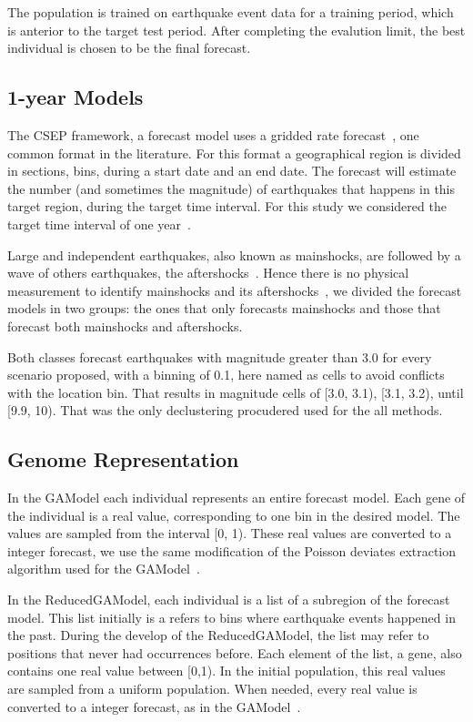The population is trained on earthquake event data for a training
period, which is anterior to the target test period. After completing
the evalution limit, the best individual is chosen to be the final
forecast.

\subsection{1-year Models}
The CSEP framework, a forecast model uses a gridded rate
forecast~\cite{zechar2010evaluating}, one common format in the
literature. For this format a geographical region is divided in
sections, bins, during a start date and an end date. The forecast will
estimate the number (and sometimes the magnitude) of earthquakes that
happens in this target region, during the target time interval. For
this study we considered the target time interval of one
year~\cite{ecta14}.

Large and independent earthquakes, also known as mainshocks, are
followed by a wave of others earthquakes, the
aftershocks~\cite{schorlemmer2010first}. Hence there is no physical
measurement to identify mainshocks and its
aftershocks~\cite{schorlemmer2010first}, we divided the forecast
models in two groups: the ones that only forecasts mainshocks and
those that forecast both mainshocks and aftershocks.

Both classes forecast earthquakes with magnitude greater than 3.0 for
every scenario proposed, with a binning of 0.1, here named as cells to
avoid conflicts with the location bin. That results in magnitude cells
of [3.0, 3.1), [3.1, 3.2), until [9.9, 10). That was the only
declustering procudered used for the all methods.

\subsection{Genome Representation}\label{genome}
In the GAModel each individual represents an entire forecast
model. Each gene of the individual is a real value, corresponding to
one bin in the desired model. The values are sampled from the interval
[0, 1). These real values are converted to a integer forecast, we use
  the same modification of the Poisson deviates extraction algorithm
  used for the GAModel~\cite{ecta14}.

In the ReducedGAModel, each individual is a list of a subregion of the
forecast model. This list initially is a refers to bins where
earthquake events happened in the past. During the develop of the
ReducedGAModel, the list may refer to positions that never had
occurrences before. Each element of the list, a gene, also contains
one real value between [0,1). In the initial population, this real
values are sampled from a uniform population. When needed, every
real value is converted to a integer forecast, as in the
GAModel~\cite{ecta14}.

